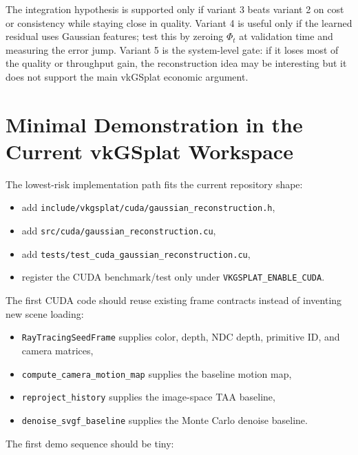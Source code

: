 \documentclass[11pt]{article}
\begin{document}
The integration hypothesis is supported only if variant 3 beats variant 2 on
cost or consistency while staying close in quality. Variant 4 is useful only if
the learned residual uses Gaussian features; test this by zeroing $\Phi_t$ at
validation time and measuring the error jump. Variant 5 is the system-level
gate: if it loses most of the quality or throughput gain, the reconstruction
idea may be interesting but it does not support the main vkGSplat economic
argument.

\section{Minimal Demonstration in the Current vkGSplat Workspace}

The lowest-risk implementation path fits the current repository shape:

\begin{itemize}
  \item add \texttt{include/vkgsplat/cuda/gaussian\_reconstruction.h},
  \item add \texttt{src/cuda/gaussian\_reconstruction.cu},
  \item add \texttt{tests/test\_cuda\_gaussian\_reconstruction.cu},
  \item register the CUDA benchmark/test only under
        \texttt{VKGSPLAT\_ENABLE\_CUDA}.
\end{itemize}

The first CUDA code should reuse existing frame contracts instead of inventing
new scene loading:

\begin{itemize}
  \item \texttt{RayTracingSeedFrame} supplies color, depth, NDC depth,
        primitive ID, and camera matrices,
  \item \texttt{compute\_camera\_motion\_map} supplies the baseline motion map,
  \item \texttt{reproject\_history} supplies the image-space TAA baseline,
  \item \texttt{denoise\_svgf\_baseline} supplies the Monte Carlo denoise
        baseline.
\end{itemize}

The first demo sequence should be tiny:
\end{document}
